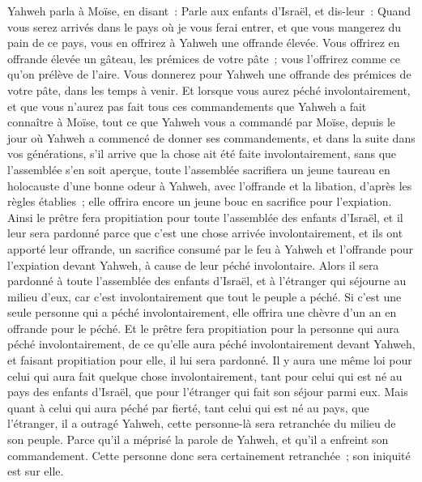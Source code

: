 \begin{multicols}{2}
Yahweh parla à Moïse, en disant~:
Parle aux enfants d'Israël, et dis-leur~: Quand vous serez arrivés dans le pays où je vous ferai entrer,
et que vous mangerez du pain de ce pays, vous en offrirez à Yahweh une offrande élevée.
Vous offrirez en offrande élevée un gâteau, les prémices de votre pâte~; vous l'offrirez comme ce qu'on prélève de l'aire.
Vous donnerez pour Yahweh une offrande des prémices de votre pâte, dans les temps à venir.
Et lorsque vous aurez péché involontairement, et que vous n'aurez pas fait tous ces commandements que Yahweh a fait connaître à Moïse,
tout ce que Yahweh vous a commandé par Moïse, depuis le jour où Yahweh a commencé de donner ses commandements, et dans la suite dans vos générations,
s'il arrive que la chose ait été faite involontairement, sans que l'assemblée s'en soit aperçue, toute l'assemblée sacrifiera un jeune taureau en holocauste d'une bonne odeur à Yahweh, avec l'offrande et la libation, d'après les règles établies~; elle offrira encore un jeune bouc en sacrifice pour l'expiation.
Ainsi le prêtre fera propitiation pour toute l'assemblée des enfants d'Israël, et il leur sera pardonné parce que c'est une chose arrivée involontairement, et ils ont apporté leur offrande, un sacrifice consumé par le feu à Yahweh et l'offrande pour l'expiation devant Yahweh, à cause de leur péché involontaire.
Alors il sera pardonné à toute l'assemblée des enfants d'Israël, et à l'étranger qui séjourne au milieu d'eux, car c'est involontairement que tout le peuple a péché.
Si c'est une seule personne qui a péché involontairement, elle offrira une chèvre d'un an en offrande pour le péché.
Et le prêtre fera propitiation pour la personne qui aura péché involontairement, de ce qu'elle aura péché involontairement devant Yahweh, et faisant propitiation pour elle, il lui sera pardonné.
Il y aura une même loi pour celui qui aura fait quelque chose involontairement, tant pour celui qui est né au pays des enfants d'Israël, que pour l'étranger qui fait son séjour parmi eux.
Mais quant à celui qui aura péché par fierté, tant celui qui est né au pays, que l'étranger, il a outragé Yahweh, cette personne-là sera retranchée du milieu de son peuple.
Parce qu'il a méprisé la parole de Yahweh, et qu'il a enfreint son commandement. Cette personne donc sera certainement retranchée~; son iniquité est sur elle.

\end{multicols}

